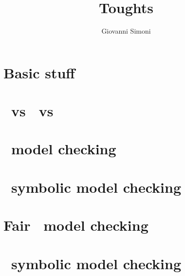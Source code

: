 \documentclass[a3paper]{article}
\title{Toughts}
\author{Giovanni Simoni}
\begin{document}
    \maketitle

    \section{Basic stuff}
    
    \newpage

    \section{\LTL\ vs \CTL\ vs \CTLs}
    
    \newpage

    \section{\CTL\ model checking}
    
    \newpage

    \section{\CTL\ symbolic model checking}
    
    \newpage

    \section{Fair \CTL\ model checking}
    

    \section{\LTL\ symbolic model checking}
    
    \newpage
\end{document}
